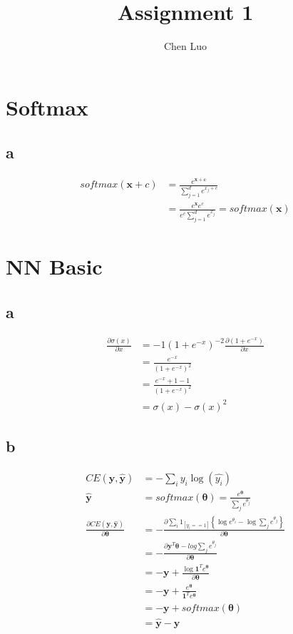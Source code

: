 \documentclass[11pt, oneside]{article}   	%
\title{Assignment 1}
\author{Chen Luo}
\begin{document}
\maketitle
\section{Softmax}
\subsection{a}
\begin{align}
softmax(\bm{x} + c) &=  \frac{e^{\bm{x+c}}}{\sum_{j = 1}^{d}{e^{x_j+c}}}\\
&= \frac{e^{\bm{x}} e^c}{e^c \sum_{j=1}^{d}{e^{x_j}}} = softmax(\bm{x})
\end{align}

\section{NN Basic}
\subsection{a}
\begin{align}
\frac{\partial\sigma(x)}{\partial x} &= -1(1+e^{-x})^{-2}\frac{\partial(1+e^{-x})}{\partial x}\\
&= \frac{e^{-x}}{(1+e^{-x})^{2}}\\
&= \frac{e^{-x}+1-1}{(1+e^{-x})^{2}}\\
&= \sigma(x)-\sigma(x)^2
\end{align}

\subsection{b}
\begin{align}
CE(\bm{y}, \hat{\bm{y}}) &= -\sum_i y_i{\log (\hat{y_i})}\\
\hat{\bm{y}} &= softmax(\bm{\theta}) = \frac{e^{\bm{\theta}}}{\sum_j{e^{\theta_j}}}\\
\frac{\partial CE(\bm{y}, \hat{\bm{y}})}{\partial \bm\theta} &= -\frac{\partial \sum_i 1_{[y_i==1]}\left\{\log{e^{\theta_i}}-\log{\sum_j {e^{\theta_j}}}\right\}}{\partial \bm{\theta}}\\
&= -\frac{\partial \bm{y}^T {\bm{\theta}} - log\sum_j e^{\theta_j}}{\partial \bm{\theta}}\\
&= -\bm{y} + \frac{\log \bm{1}^T e^{\bm{\theta}}}{\partial \bm{\theta}}\\
&= -\bm{y} + \frac{e^{\bm{\theta}}}{\bm{1}^T e^{\bm{\theta}}}\\
&= -\bm{y} + softmax(\bm{\theta})\\
&= \hat{\bm{y}} - \bm{y}
\end{align}
\end{document}
